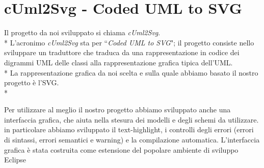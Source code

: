 \section{cUml2Svg - Coded UML to SVG} 
Il progetto da noi sviluppato si chiama \emph{cUml2Svg}. \\*
L'acronimo \emph{cUml2Svg} sta per ``\emph{Coded UML to SVG}"; 
il progetto consiste nello sviluppare un traduttore che traduca da una
rappresentazione in codice dei digrammi UML delle classi alla rappresentazione
grafica tipica dell'UML.\\*
La rappresentazione grafica da noi scelta e sulla quale abbiamo basato il nostro
progetto è l'SVG.\\*


Per utilizzare al meglio il nostro progetto abbiamo sviluppato anche una 
interfaccia grafica, che aiuta nella stesura dei modelli e degli schemi da
utilizzare. in particolare abbiamo sviluppato il text-highlight, i
controlli degli errori (errori di sintassi, errori semantici e warning) e la
compilazione automatica.
L'interfaccia grafica è stata costruita
come estensione del popolare ambiente di sviluppo Eclipse~\cite{eclipse_website:1}

